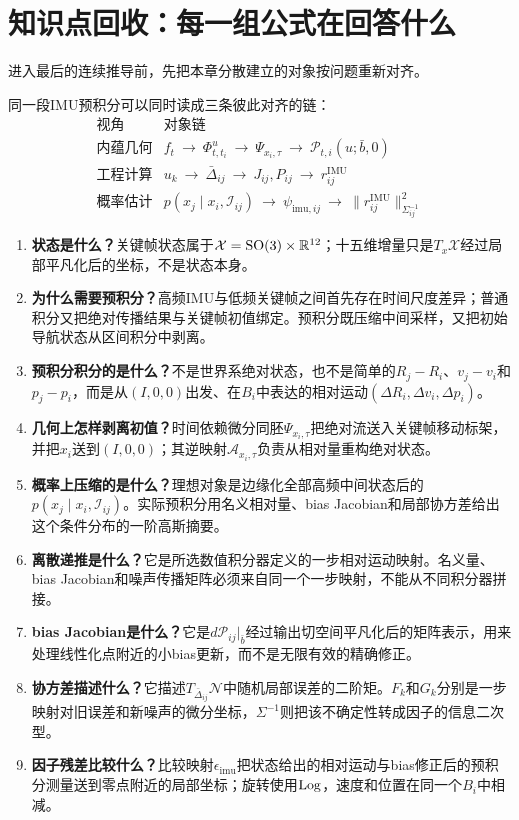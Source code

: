 \section{知识点回收：每一组公式在回答什么}

进入最后的连续推导前，先把本章分散建立的对象按问题重新对齐。

同一段IMU预积分可以同时读成三条彼此对齐的链：
\[
\begin{array}{c|l}
\text{视角} & \text{对象链}\\ \hline
\text{内蕴几何} &
f_t\ \to\ \Phi^u_{t,t_i}\ \to\
\Psi_{x_i,\tau}\ \to\ \mathcal P_{t,i}(u;\bar b,0)\\
\text{工程计算} &
u_k\ \to\ \bar\Delta_{ij}\ \to\
J_{ij},P_{ij}\ \to\ r_{ij}^{\mathrm{IMU}}\\
\text{概率估计} &
p(x_j\mid x_i,\mathcal I_{ij})\ \to\
\psi_{\mathrm{imu},ij}\ \to\
\|r_{ij}^{\mathrm{IMU}}\|_{\Sigma_{ij}^{-1}}^2
\end{array}
\]

\begin{enumerate}
    \item \textbf{状态是什么？}关键帧状态属于$\mathcal X=\operatorname{SO}(3)\times\mathbb{R}^{12}$；十五维增量只是$T_x\mathcal X$经过局部平凡化后的坐标，不是状态本身。
    \item \textbf{为什么需要预积分？}高频IMU与低频关键帧之间首先存在时间尺度差异；普通积分又把绝对传播结果与关键帧初值绑定。预积分既压缩中间采样，又把初始导航状态从区间积分中剥离。
    \item \textbf{预积分积分的是什么？}不是世界系绝对状态，也不是简单的$R_j-R_i$、$v_j-v_i$和$p_j-p_i$，而是从$(I,0,0)$出发、在$B_i$中表达的相对运动$(\Delta R_i,\Delta v_i,\Delta p_i)$。
    \item \textbf{几何上怎样剥离初值？}时间依赖微分同胚$\Psi_{x_i,\tau}$把绝对流送入关键帧移动标架，并把$x_i$送到$(I,0,0)$；其逆映射$\mathcal A_{x_i,\tau}$负责从相对量重构绝对状态。
    \item \textbf{概率上压缩的是什么？}理想对象是边缘化全部高频中间状态后的$p(x_j\mid x_i,\mathcal I_{ij})$。实际预积分用名义相对量、bias Jacobian和局部协方差给出这个条件分布的一阶高斯摘要。
    \item \textbf{离散递推是什么？}它是所选数值积分器定义的一步相对运动映射。名义量、bias Jacobian和噪声传播矩阵必须来自同一个一步映射，不能从不同积分器拼接。
    \item \textbf{bias Jacobian是什么？}它是$d\mathcal P_{ij}|_{\bar b}$经过输出切空间平凡化后的矩阵表示，用来处理线性化点附近的小bias更新，而不是无限有效的精确修正。
    \item \textbf{协方差描述什么？}它描述$T_{\bar\Delta_{ij}}\mathcal N$中随机局部误差的二阶矩。$F_k$和$G_k$分别是一步映射对旧误差和新噪声的微分坐标，$\Sigma^{-1}$则把该不确定性转成因子的信息二次型。
    \item \textbf{因子残差比较什么？}比较映射$\epsilon_{\mathrm{imu}}$把状态给出的相对运动与bias修正后的预积分测量送到零点附近的局部坐标；旋转使用$\operatorname{Log}$，速度和位置在同一个$B_i$中相减。
\end{enumerate}

